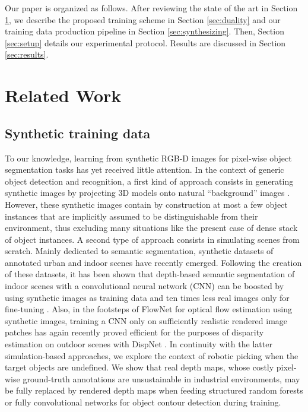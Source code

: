 \documentclass[runningheads,a4paper]{llncs}
\begin{document}
Our paper is organized as follows. After reviewing the state of the art in Section \ref{sec:state-of-the-art}, we describe the proposed training scheme in Section \ref{sec:duality} and our training data production pipeline in Section \ref{sec:synthesizing}. Then, Section \ref{sec:setup} details our experimental protocol. Results are discussed in Section \ref{sec:results}.

\section{Related Work}
\label{sec:state-of-the-art}

\subsection{Synthetic training data}

To our knowledge, learning from synthetic RGB-D images for pixel-wise object segmentation tasks has yet received little attention. In the context of generic object detection and recognition, a first kind of approach consists in generating synthetic images by projecting 3D models onto natural ``background'' images \cite{PengSAS15, RozantsevLF15}. However, these synthetic images contain by construction at most a few object instances that are implicitly assumed to be distinguishable from their environment, thus excluding many situations like the present case of dense stack of object instances. A second type of approach consists in simulating scenes from scratch. Mainly dedicated to semantic segmentation, synthetic datasets of annotated urban \cite{Ros_2016_CVPR} and indoor \cite{HandaPSC16} scenes have recently emerged. Following the creation of these datasets, it has been shown that depth-based semantic segmentation of indoor scenes with a convolutional neural network (CNN) can be boosted by using synthetic images as training data and ten times less real images only for fine-tuning \cite{Handa_2016_CVPR}. Also, in the footsteps of FlowNet \cite{DosovitskiyFIHH15} for optical flow estimation using synthetic images, training a CNN only on sufficiently realistic rendered image patches has again recently proved efficient for the purposes of disparity estimation on outdoor scenes with DispNet \cite{Mayer_2016_CVPR}. In continuity with the latter simulation-based approaches, we explore the context of robotic picking when the target objects are undefined. We show that real depth maps, whose costly pixel-wise ground-truth annotations are unsustainable in industrial environments, may be fully replaced by rendered depth maps when feeding structured random forests or fully convolutional networks for object contour detection during training.
\end{document}
